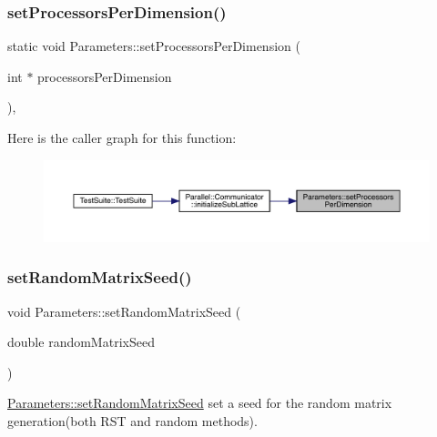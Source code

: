 \subsubsection{\texorpdfstring{setProcessorsPerDimension()}{setProcessorsPerDimension()}}
{\footnotesize\ttfamily static void Parameters\+::set\+Processors\+Per\+Dimension (\begin{DoxyParamCaption}\item[{int $\ast$}]{processors\+Per\+Dimension }\end{DoxyParamCaption})\hspace{0.3cm}{\ttfamily [inline]}, {\ttfamily [static]}}

Here is the caller graph for this function\+:
\nopagebreak
\begin{figure}[H]
\begin{center}
\leavevmode
\includegraphics[width=350pt]{class_parameters_a4c983b1ab17ec51be118792b3a6d17a5_icgraph}
\end{center}
\end{figure}
\mbox{\label{class_parameters_a46615f8286bd7363ab1f09074fdc6940}} 
\subsubsection{\texorpdfstring{setRandomMatrixSeed()}{setRandomMatrixSeed()}}
{\footnotesize\ttfamily void Parameters\+::set\+Random\+Matrix\+Seed (\begin{DoxyParamCaption}\item[{double}]{random\+Matrix\+Seed }\end{DoxyParamCaption})\hspace{0.3cm}{\ttfamily [static]}}



\mbox{\hyperlink{class_parameters_a46615f8286bd7363ab1f09074fdc6940}{Parameters\+::set\+Random\+Matrix\+Seed}} set a seed for the random matrix generation(both R\+S\+T and random methods). 


